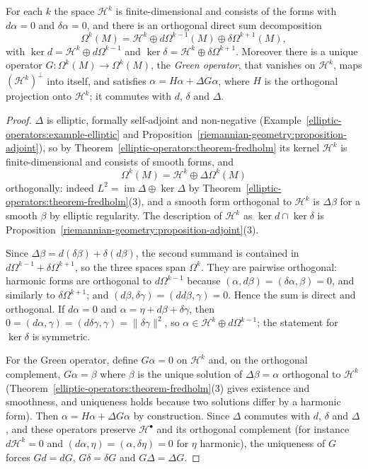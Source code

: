 \begin{theorem}\label{hodge-theorem:theorem-decomposition}
For each $k$ the space $\mathcal{H}^k$ is finite-dimensional and consists of the forms with $d\alpha = 0$ and $\delta\alpha = 0$, and there is an orthogonal direct sum decomposition
\[
\Omega^k(M) = \mathcal{H}^k \oplus d\Omega^{k-1}(M) \oplus \delta\Omega^{k+1}(M),
\]
with $\ker d = \mathcal{H}^k \oplus d\Omega^{k-1}$ and $\ker\delta = \mathcal{H}^k \oplus \delta\Omega^{k+1}$. Moreover there is a unique operator $G \colon \Omega^k(M) \to \Omega^k(M)$, the \emph{Green operator},
that vanishes on $\mathcal{H}^k$, maps $(\mathcal{H}^k)^\perp$ into itself, and satisfies $\alpha = H\alpha + \Delta G\alpha$, where $H$ is the orthogonal projection onto $\mathcal{H}^k$; it commutes with $d$,
$\delta$ and $\Delta$.
\end{theorem}

\begin{proof}
$\Delta$ is elliptic, formally self-adjoint and non-negative (Example~\ref{elliptic-operators:example-elliptic} and
Proposition~\ref{riemannian-geometry:proposition-adjoint}), so by Theorem~\ref{elliptic-operators:theorem-fredholm} its kernel $\mathcal{H}^k$ is finite-dimensional and consists of smooth forms, and
\[
\Omega^k(M) = \mathcal{H}^k \oplus \Delta\Omega^k(M)
\]
orthogonally: indeed $L^2 = \operatorname{im}\Delta \oplus \ker\Delta$ by Theorem~\ref{elliptic-operators:theorem-fredholm}(3), and a smooth form orthogonal to $\mathcal{H}^k$ is $\Delta\beta$ for a smooth $\beta$
by elliptic regularity. The description of $\mathcal{H}^k$ as $\ker d \cap \ker\delta$ is
Proposition~\ref{riemannian-geometry:proposition-adjoint}(3).

Since $\Delta\beta = d(\delta\beta) + \delta(d\beta)$, the second summand is contained in $d\Omega^{k-1} + \delta\Omega^{k+1}$, so the three spaces span $\Omega^k$. They are pairwise orthogonal: harmonic forms are
orthogonal to $d\Omega^{k-1}$ because $(\alpha, d\beta) = (\delta\alpha, \beta) = 0$, and similarly to $\delta\Omega^{k+1}$; and $(d\beta, \delta\gamma) = (dd\beta, \gamma) = 0$. Hence the sum is direct and
orthogonal. If $d\alpha = 0$ and $\alpha = \eta + d\beta + \delta\gamma$, then $0 = (d\alpha, \gamma) = (d\delta\gamma, \gamma) = \|\delta\gamma\|^2$, so $\alpha \in \mathcal{H}^k \oplus d\Omega^{k-1}$; the statement for
$\ker\delta$ is symmetric.

For the Green operator, define $G\alpha = 0$ on $\mathcal{H}^k$ and, on the orthogonal complement, $G\alpha = \beta$ where $\beta$ is the unique solution of $\Delta\beta = \alpha$ orthogonal to $\mathcal{H}^k$
(Theorem~\ref{elliptic-operators:theorem-fredholm}(3) gives existence and smoothness, and uniqueness holds because two solutions differ by a harmonic form). Then $\alpha = H\alpha + \Delta G\alpha$ by
construction. Since $\Delta$ commutes with $d$, $\delta$ and $\Delta$, and these operators preserve $\mathcal{H}^\bullet$ and its orthogonal complement (for instance $d\mathcal{H}^k = 0$ and
$(d\alpha, \eta) = (\alpha, \delta\eta) = 0$ for $\eta$ harmonic), the uniqueness of $G$ forces $Gd = dG$, $G\delta = \delta G$ and $G\Delta = \Delta G$.
\end{proof}

